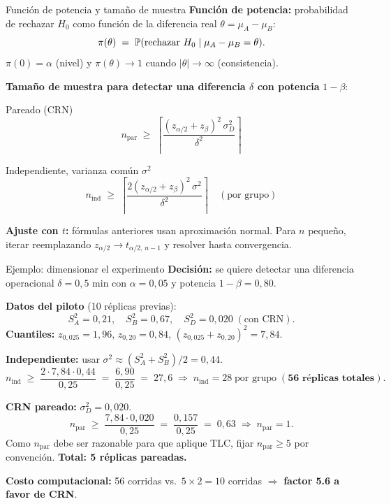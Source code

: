 \documentclass[aspectratio=1610, 10pt]{beamer}
\begin{document}
\begin{frame}{Función de potencia y tamaño de muestra}
\textbf{Función de potencia:} probabilidad de rechazar $H_0$ como función de la diferencia real $\theta = \mu_A - \mu_B$:
\[
\pi(\theta) \;=\; \mathbb{P}(\text{rechazar } H_0 \mid \mu_A - \mu_B = \theta).
\]
$\pi(0) = \alpha$ (nivel) y $\pi(\theta) \to 1$ cuando $|\theta| \to \infty$ (consistencia).

\vspace{0.2cm}
\textbf{Tamaño de muestra para detectar una diferencia $\delta$ con potencia} $1-\beta$:

\vspace{0.1cm}
\begin{block}{Pareado (CRN)}
\[
n_{\text{par}} \;\geq\; \left\lceil \frac{(z_{\alpha/2} + z_\beta)^2 \, \sigma_D^2}{\delta^2} \right\rceil
\]
\end{block}

\begin{block}{Independiente, varianza común $\sigma^2$}
\[
n_{\text{ind}} \;\geq\; \left\lceil \frac{2(z_{\alpha/2} + z_\beta)^2 \, \sigma^2}{\delta^2} \right\rceil \quad (\text{por grupo})
\]
\end{block}

\vspace{0.1cm}
\footnotesize
\textbf{Ajuste con $t$:} fórmulas anteriores usan aproximación normal. Para $n$ pequeño, iterar reemplazando $z_{\alpha/2} \to t_{\alpha/2,\,n-1}$ y resolver hasta convergencia.
\end{frame}

\begin{frame}{Ejemplo: dimensionar el experimento}
\textbf{Decisión:} se quiere detectar una diferencia operacional $\delta = 0{,}5$ min con $\alpha = 0{,}05$ y potencia $1-\beta = 0{,}80$.

\textbf{Datos del piloto} (10 réplicas previas):
\[
S_A^2 = 0{,}21, \quad S_B^2 = 0{,}67, \quad S_D^2 = 0{,}020 \;(\text{con CRN}).
\]
\textbf{Cuantiles:} $z_{0{,}025} = 1{,}96$, $z_{0{,}20} = 0{,}84$, $(z_{0{,}025}+z_{0{,}20})^2 = 7{,}84$.

\vspace{0.3cm}
\textbf{Independiente:} usar $\sigma^2 \approx (S_A^2+S_B^2)/2 = 0{,}44$.
\[
n_{\text{ind}} \;\geq\; \frac{2 \cdot 7{,}84 \cdot 0{,}44}{0{,}25} \;=\; \frac{6{,}90}{0{,}25} \;=\; 27{,}6 \;\Rightarrow\; n_{\text{ind}} = 28 \;\text{por grupo}\;(\textbf{56 réplicas totales}).
\]

\textbf{CRN pareado:} $\sigma_D^2 = 0{,}020$.
\[
n_{\text{par}} \;\geq\; \frac{7{,}84 \cdot 0{,}020}{0{,}25} \;=\; \frac{0{,}157}{0{,}25} \;=\; 0{,}63 \;\Rightarrow\; n_{\text{par}} = 1.
\]
Como $n_{\text{par}}$ debe ser razonable para que aplique TLC, fijar $n_{\text{par}}\geq 5$ por convención. \textbf{Total: 5 réplicas pareadas.}

\vspace{0.2cm}
\textbf{Costo computacional:} 56 corridas vs.\ $5\times 2 = 10$ corridas $\Rightarrow$ \textbf{factor 5.6 a favor de CRN}.
\end{frame}
\end{document}
